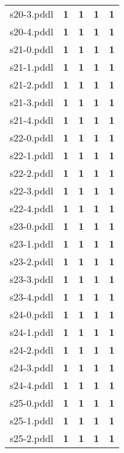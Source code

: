 \documentclass{article}
\begin{document}
\begin{tabular}{@{}lrrrr@{}}
s20-3.pddl & \textbf{1} & \textbf{1} & \textbf{1} & \textbf{1} \\
s20-4.pddl & \textbf{1} & \textbf{1} & \textbf{1} & \textbf{1} \\
s21-0.pddl & \textbf{1} & \textbf{1} & \textbf{1} & \textbf{1} \\
s21-1.pddl & \textbf{1} & \textbf{1} & \textbf{1} & \textbf{1} \\
s21-2.pddl & \textbf{1} & \textbf{1} & \textbf{1} & \textbf{1} \\
s21-3.pddl & \textbf{1} & \textbf{1} & \textbf{1} & \textbf{1} \\
s21-4.pddl & \textbf{1} & \textbf{1} & \textbf{1} & \textbf{1} \\
s22-0.pddl & \textbf{1} & \textbf{1} & \textbf{1} & \textbf{1} \\
s22-1.pddl & \textbf{1} & \textbf{1} & \textbf{1} & \textbf{1} \\
s22-2.pddl & \textbf{1} & \textbf{1} & \textbf{1} & \textbf{1} \\
s22-3.pddl & \textbf{1} & \textbf{1} & \textbf{1} & \textbf{1} \\
s22-4.pddl & \textbf{1} & \textbf{1} & \textbf{1} & \textbf{1} \\
s23-0.pddl & \textbf{1} & \textbf{1} & \textbf{1} & \textbf{1} \\
s23-1.pddl & \textbf{1} & \textbf{1} & \textbf{1} & \textbf{1} \\
s23-2.pddl & \textbf{1} & \textbf{1} & \textbf{1} & \textbf{1} \\
s23-3.pddl & \textbf{1} & \textbf{1} & \textbf{1} & \textbf{1} \\
s23-4.pddl & \textbf{1} & \textbf{1} & \textbf{1} & \textbf{1} \\
s24-0.pddl & \textbf{1} & \textbf{1} & \textbf{1} & \textbf{1} \\
s24-1.pddl & \textbf{1} & \textbf{1} & \textbf{1} & \textbf{1} \\
s24-2.pddl & \textbf{1} & \textbf{1} & \textbf{1} & \textbf{1} \\
s24-3.pddl & \textbf{1} & \textbf{1} & \textbf{1} & \textbf{1} \\
s24-4.pddl & \textbf{1} & \textbf{1} & \textbf{1} & \textbf{1} \\
s25-0.pddl & \textbf{1} & \textbf{1} & \textbf{1} & \textbf{1} \\
s25-1.pddl & \textbf{1} & \textbf{1} & \textbf{1} & \textbf{1} \\
s25-2.pddl & \textbf{1} & \textbf{1} & \textbf{1} & \textbf{1} \\

\end{tabular}
\end{document}
